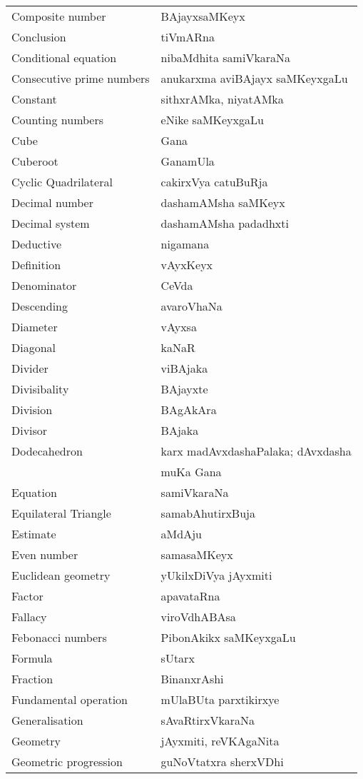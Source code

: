 {\begin{longtable}{>{\rm}l@{\hspace{1cm}}l}
Composite number & BAjayxsaMKeyx\\
Conclusion & tiVmARna\\
Conditional equation & nibaMdhita samiVkaraNa\\
Consecutive prime numbers & anukarxma aviBAjayx saMKeyxgaLu\\
Constant & sithxrAMka, niyatAMka\\
Counting numbers & eNike saMKeyxgaLu\\
Cube & Gana\\
Cuberoot & GanamUla\\
Cyclic Quadrilateral & cakirxVya catuBuRja\\
Decimal number & dashamAMsha saMKeyx\\
Decimal system & dashamAMsha padadhxti\\
Deductive & nigamana\\
Definition & vAyxKeyx\\
Denominator & CeVda\\
Descending & avaroVhaNa\\
Diameter & vAyxsa\\
Diagonal & kaNaR\\
Divider & viBAjaka\\
Divisibality & BAjayxte\\
Division & BAgAkAra\\
Divisor & BAjaka\\
Dodecahedron & karx madAvxdashaPalaka; dAvxdasha\\[-0.1cm]
& muKa Gana\\
Equation & samiVkaraNa\\
Equilateral Triangle & samabAhutirxBuja\\
Estimate & aMdAju\\
Even number & samasaMKeyx\\
Euclidean geometry & yUkilxDiVya jAyxmiti\\
Factor & apavataRna\\
Fallacy & viroVdhABAsa\\
Febonacci numbers & PibonAkikx saMKeyxgaLu\\
Formula & sUtarx\\
Fraction & BinanxrAshi\\
Fundamental operation & mUlaBUta parxtikirxye\\
Generalisation & sAvaRtirxVkaraNa\\
Geometry & jAyxmiti, reVKAgaNita\\
Geometric progression & guNoVtatxra sherxVDhi\\

\end{longtable}}
